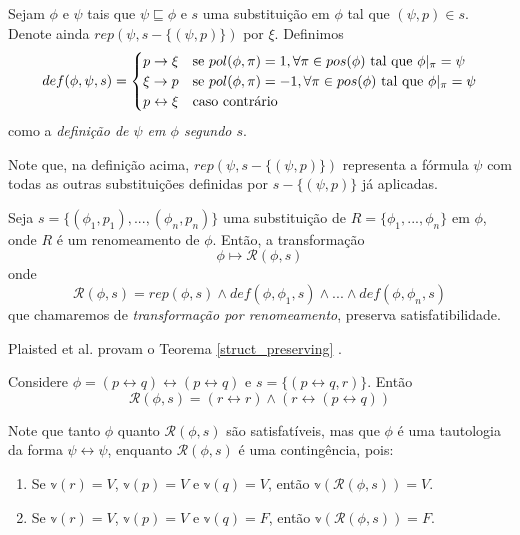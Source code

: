 \begin{definition}
	Sejam $\phi$ e $\psi$ tais que $\psi \sqsubseteq \phi$ e $s$ uma substituição em $\phi$ tal que $(\psi,p) \in s$. Denote ainda $rep(\psi,s-\{(\psi,p)\})$ por $\xi$. Definimos
	\[
	def(\phi,\psi,s) =
	\begin{cases} 
	\hfill p \rightarrow \xi \hfill     & \text{se } pol(\phi,\pi) = 1, \forall \pi \in pos(\phi) \text{ tal que } \phi|_\pi = \psi\\
	\hfill \xi \rightarrow p \hfill     & \text{se } pol(\phi,\pi) = -1, \forall \pi \in pos(\phi) \text{ tal que } \phi|_\pi = \psi\\
	\hfill p \leftrightarrow \xi \hfill & \text{caso contrário}\\
	\end{cases}
	\]
	como a \emph{definição de $\psi$ em $\phi$ segundo $s$}.
\end{definition}

Note que, na definição acima, $rep(\psi,s-\{(\psi,p)\})$ representa a fórmula $\psi$ com todas as outras substituições definidas por $s-\{(\psi,p)\}$ já aplicadas.

\begin{theorem}
	\label{struct_preserving}
	Seja $s = \{(\phi_1,p_1),...,(\phi_n,p_n) \}$ uma substituição de $R = \{\phi_1,...,\phi_n \}$ em $\phi$, onde $R$ é um renomeamento de $\phi$. Então, a transformação $$\phi \longmapsto \mathcal{R}(\phi,s)$$ onde $$\mathcal{R}(\phi,s) = rep(\phi,s) \wedge def(\phi,\phi_1,s) \wedge ... \wedge def(\phi,\phi_n,s)$$
    que chamaremos de \emph{transformação por renomeamento}, preserva satisfatibilidade.
\end{theorem}

Plaisted et al. provam o Teorema \ref{struct_preserving} \cite{plaisted1986structure}.

\begin{example}
	\label{exemplo_renaming}
    Considere $\phi = (p \leftrightarrow q) \leftrightarrow (p \leftrightarrow q)$ e $s = \{(p \leftrightarrow q, r) \}$. Então $$\mathcal{R}(\phi,s) = (r \leftrightarrow r) \wedge (r \leftrightarrow (p \leftrightarrow q))$$
    
    Note que tanto $\phi$ quanto $\mathcal{R}(\phi,s)$ são satisfatíveis, mas que $\phi$ é uma tautologia da forma $\psi \leftrightarrow \psi$, enquanto $\mathcal{R}(\phi,s)$ é uma contingência, pois:
    \begin{enumerate}
    	\item Se $\mathbb{v}(r) = V$, $\mathbb{v}(p) = V$ e $\mathbb{v}(q) = V$, então $\mathbb{v}(\mathcal{R}(\phi,s)) = V$.
    	\item Se $\mathbb{v}(r) = V$, $\mathbb{v}(p) = V$ e $\mathbb{v}(q) = F$, então $\mathbb{v}(\mathcal{R}(\phi,s)) = F$.
    \end{enumerate}
\end{example}

